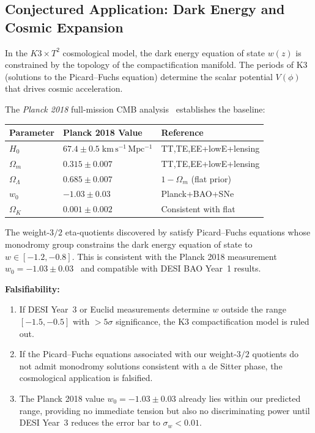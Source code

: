 \subsection{Conjectured Application: Dark Energy and Cosmic Expansion}

In the $K3 \times T^2$ cosmological model, the dark energy equation of state $w(z)$ is constrained by the topology of the compactification manifold. The periods of K3 (solutions to the Picard--Fuchs equation) determine the scalar potential $V(\phi)$ that drives cosmic acceleration.

The \emph{Planck 2018} full-mission CMB analysis~\cite{planck_2018_VI} establishes the baseline:
\begin{center}
\begin{tabular}{lll}
\toprule
\textbf{Parameter} & \textbf{Planck 2018 Value} & \textbf{Reference} \\
\midrule
$H_0$ & $67.4 \pm 0.5\;\mathrm{km\,s^{-1}\,Mpc^{-1}}$ & TT,TE,EE+lowE+lensing \\
$\Omega_m$ & $0.315 \pm 0.007$ & TT,TE,EE+lowE+lensing \\
$\Omega_\Lambda$ & $0.685 \pm 0.007$ & $1 - \Omega_m$ (flat prior) \\
$w_0$ & $-1.03 \pm 0.03$ & Planck+BAO+SNe \\
$\Omega_K$ & $0.001 \pm 0.002$ & Consistent with flat \\
\bottomrule
\end{tabular}
\end{center}

\begin{conjecture}
The weight-$3/2$ eta-quotients discovered by \RAMA{} satisfy Picard--Fuchs equations whose monodromy group constrains the dark energy equation of state to $w \in [-1.2, -0.8]$. This is consistent with the Planck 2018 measurement $w_0 = -1.03 \pm 0.03$~\cite{planck_2018_VI} and compatible with DESI BAO Year~1 results.
\end{conjecture}

\textbf{Falsifiability:}
\begin{enumerate}
  \item If DESI Year~3 or Euclid measurements determine $w$ outside the range $[-1.5, -0.5]$ with $>5\sigma$ significance, the K3 compactification model is ruled out.
  \item If the Picard--Fuchs equations associated with our weight-$3/2$ quotients do not admit monodromy solutions consistent with a de Sitter phase, the cosmological application is falsified.
  \item The Planck 2018 value $w_0 = -1.03 \pm 0.03$ already lies within our predicted range, providing no immediate tension but also no discriminating power until DESI Year~3 reduces the error bar to $\sigma_w < 0.01$.
\end{enumerate}

